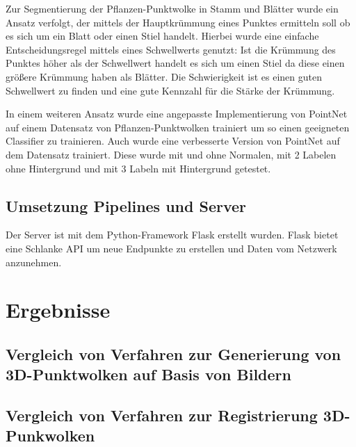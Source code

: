 \documentclass[12pt,titlepage,twoside]{article}
\begin{document}
Zur Segmentierung der Pflanzen-Punktwolke in Stamm und Blätter wurde ein Ansatz verfolgt, der mittels der Hauptkrümmung eines Punktes ermitteln soll ob es sich um ein Blatt oder einen Stiel handelt. 
Hierbei wurde eine einfache Entscheidungsregel mittels eines Schwellwerts genutzt: Ist die Krümmung des Punktes höher als der Schwellwert handelt es sich um einen Stiel da diese einen größere Krümmung haben als Blätter.
Die Schwierigkeit ist es einen guten Schwellwert zu finden und eine  gute Kennzahl für die Stärke der Krümmung.

In einem weiteren Ansatz wurde eine angepasste Implementierung von PointNet auf einem Datensatz von Pflanzen-Punktwolken trainiert um so einen geeigneten Classifier zu trainieren.
Auch wurde eine verbesserte Version von PointNet auf dem Datensatz trainiert. Diese wurde mit und ohne Normalen, mit 2 Labelen ohne Hintergrund und mit 3 Labeln mit Hintergrund getestet. 

\subsection{Umsetzung Pipelines und Server}
\label{sec:realisierung:implementierung2}
Der Server ist mit dem Python-Framework Flask erstellt wurden. Flask bietet eine Schlanke API um neue Endpunkte zu erstellen und Daten vom Netzwerk anzunehmen.


\newpage
\section{Ergebnisse}
\label{sec:ergebnisse}
%

\subsection{Vergleich von Verfahren zur Generierung von 3D-Punktwolken auf Basis von Bildern}

\subsection{Vergleich von Verfahren zur Registrierung 3D-Punkwolken}
\end{document}
